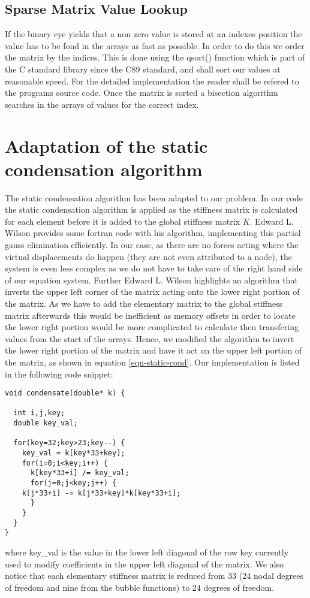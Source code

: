 \subsection{Sparse Matrix Value Lookup}
If the binary eye yields that a non zero value is stored at an indexes
position the value has to be fond in the arrays as fast as possible. In
order to do this we order the matrix by the indices. This is done using the
qsort() function which is part of the C standard library since the C89
standard, and shall sort our values at reasonable speed. For the
detailed implementation the reader shall be refered to the programs
source code. Once the matrix is sorted a bisection algorithm
searches in the arrays of values for the correct index.

\section{Adaptation of the static condensation algorithm}
The static condensation algorithm has been adapted to our problem. In
our code the static condensation algorithm is applied as the stiffness
matrix is calculated for each element before it is added to the global
stiffness matrix $K$. Edward L. Wilson \cite{static-cond} provides
some fortran code with his algorithm, implementing this partial gauss
elimination efficiently. In our case, as there are no forces acting
where the virtual displacements do happen (they are not even
attributed to a node), the system is even less complex
as we do not have to take care of the right hand side of our equation
system. Further Edward L. Wilson highlights an algorithm that inverts
the upper left corner of the matrix acting onto the lower right portion of the
matrix. As we have to add the elementary matrix to the global
stiffness matrix afterwards this would be inefficient as memory
offsets in order to locate the lower right portion would be more
complicated to calculate then transfering values from the start of the
arrays. Hence, we modified the algorithm to invert the lower right
portion of the matrix and have it act on the upper left portion of the
matrix, as shown in equation \ref{eqn-static-cond}. Our implementation
is listed in the following code snippet:
\begin{lstlisting}
void condensate(double* k) {
    
  int i,j,key;
  double key_val;
    
  for(key=32;key>23;key--) {
    key_val = k[key*33+key];
    for(i=0;i<key;i++) {
      k[key*33+i] /= key_val;
      for(j=0;j<key;j++) {
	k[j*33+i] -= k[j*33+key]*k[key*33+i];
      }
    }
  }
}
\end{lstlisting}
where key\_val is the value in the lower left diagonal of the row key
currently used to modify coefficients in the upper left diagonal of
the matrix. We also notice that each elementary stiffness matrix is
reduced from 33 (24 nodal degrees of freedom and nine from the bubble
functions) to 24 degrees of freedom.

